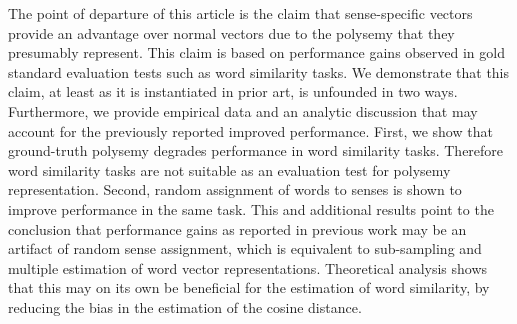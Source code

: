 The point of departure of this article is the claim that sense-specific vectors provide an advantage over normal vectors due to the polysemy that they presumably represent. This claim is based on performance gains observed in gold standard evaluation tests such as word similarity tasks. We demonstrate that this claim, at least as it is instantiated in prior art, is unfounded in two ways. Furthermore, we provide empirical data and an analytic discussion that may account for the previously reported improved performance. First, we show that ground-truth polysemy degrades performance in word similarity tasks. Therefore word similarity tasks are not suitable as an evaluation test for polysemy representation. Second, random assignment of words to senses is shown to improve performance in the same task. This and additional results point to the conclusion that performance gains as reported in previous work may be an artifact of random sense assignment, which is equivalent to sub-sampling and multiple estimation of word vector representations. Theoretical analysis shows that this may on its own be beneficial for the estimation of word similarity, by reducing the bias in the estimation of the cosine distance.
